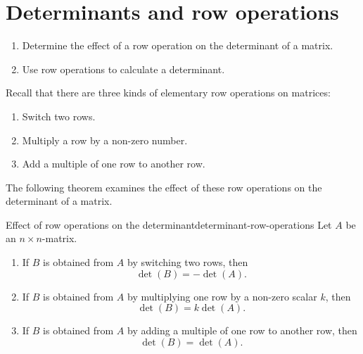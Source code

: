 \section{Determinants and row operations}

\begin{outcome}
  \begin{enumerate}
  \item Determine the effect of a row operation on the determinant of
    a matrix.
  \item Use row operations to calculate a determinant.
  \end{enumerate}
\end{outcome}

Recall that there are three kinds of elementary row operations%
%
%
%
 on matrices:
\begin{enumerate}
\item Switch two rows.
\item Multiply a row by a non-zero number.
\item Add a multiple of one row to another row.
\end{enumerate}
The following theorem examines the effect of these row operations on
the determinant of a matrix.

\begin{theorem}{Effect of row operations on the determinant}{determinant-row-operations}
  Let $A$ be an $n\times n$-matrix.
  \begin{enumerate}
  \item If $B$ is obtained from $A$ by switching two rows, then
    \begin{equation*}
      \det(B) = -\det(A).
    \end{equation*}
  \item If $B$ is obtained from $A$ by multiplying one row by a
    non-zero scalar $k$, then
    \begin{equation*}
      \det(B) = k\det(A).
    \end{equation*}
  \item If $B$ is obtained from $A$ by adding a multiple of one row to
    another row, then
    \begin{equation*}
      \det(B) = \det(A).
    \end{equation*}
  \end{enumerate}
\end{theorem}

